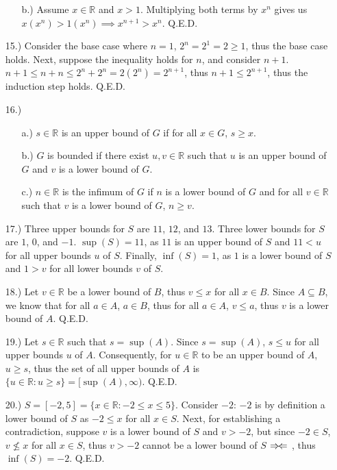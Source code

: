 \documentclass[12pt]{article}
\newcommand{\contradiction}{
    \ensuremath{{\Rightarrow\mspace{-2mu}\Leftarrow}}
}
\begin{document}
\begin{itemize}
\begin{itemize}
        \item [b.)] Assume $x\in\mathbb{R}$ and $x>1$. Multiplying both terms by $x^n$ gives us $x(x^n)>1(x^n)\implies x^{n+1}>x^n$. Q.E.D.
    \end{itemize}

    \item [15.)] Consider the base case where $n=1$, $2^n=2^1=2\geq1$, thus the base case holds. Next, suppose the inequality holds for $n$, and consider $n+1$. $n+1\leq n+n\leq2^n+2^n=2(2^n)=2^{n+1}$, thus $n+1\leq2^{n+1}$, thus the induction step holds. Q.E.D.

    \pagebreak
    \item [16.)] \begin{itemize}
        \item [a.)] $s\in\mathbb{R}$ is an upper bound of $G$ if for all $x\in G$, $s\geq x$.

        \item [b.)] $G$ is bounded if there exist $u,v\in\mathbb{R}$ such that $u$ is an upper bound of $G$ and $v$ is a lower bound of $G$.

        \item [c.)] $n\in\mathbb{R}$ is the infimum of $G$ if $n$ is a lower bound of $G$ and for all $v\in\mathbb{R}$ such that $v$ is a lower bound of $G$, $n\geq v$.
    \end{itemize}

    \item [17.)] Three upper bounds for $S$ are $11$, $12$, and $13$. Three lower bounds for $S$ are $1$, $0$, and $-1$. $\sup(S)=11$, as $11$ is an upper bound of $S$ and $11<u$ for all upper bounds $u$ of $S$. Finally, $\inf(S)=1$, as $1$ is a lower bound of $S$ and $1>v$ for all lower bounds $v$ of $S$.

    \item [18.)] Let $v\in\mathbb{R}$ be a lower bound of $B$, thus $v\leq x$ for all $x\in B$. Since $A\subseteq B$, we know that for all $a\in A$, $a\in B$, thus for all $a\in A$, $v\leq a$, thus $v$ is a lower bound of $A$. Q.E.D.

    \item [19.)] Let $s\in\mathbb{R}$ such that $s=\sup(A)$. Since $s=\sup(A)$, $s\leq u$ for all upper bounds $u$ of $A$. Consequently, for $u\in\mathbb{R}$ to be an upper bound of $A$, $u\geq s$, thus the set of all upper bounds of $A$ is $\{u\in\mathbb{R}:u\geq s\}=[\sup(A),\infty)$. Q.E.D.

    \item [20.)] $S=[-2,5]=\{x\in\mathbb{R}:-2\leq x\leq5\}$. Consider $-2$: $-2$ is by definition a lower bound of $S$ as $-2\leq x$ for all $x\in S$. Next, for establishing a contradiction, suppose $v$ is a lower bound of $S$ and $v>-2$, but since $-2\in S$, $v\not\leq x$ for all $x\in S$, thus $v>-2$ cannot be a lower bound of $S$\contradiction, thus $\inf(S)=-2$. Q.E.D.
\end{itemize}
\end{document}
